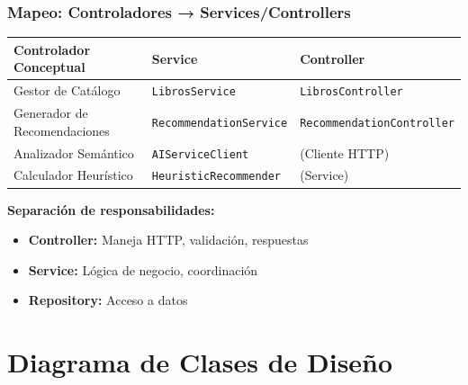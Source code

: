\documentclass[aspectratio=169]{beamer}
\begin{document}
\begin{frame}
\frametitle{Mapeo: Controladores → Services/Controllers}

\begin{table}
\centering
\tiny
\begin{tabular}{p{3.5cm}p{3.5cm}p{3.5cm}}
\toprule
\textbf{Controlador Conceptual} & \textbf{Service} & \textbf{Controller} \\
\midrule
Gestor de Catálogo & \texttt{LibrosService} & \texttt{LibrosController} \\
Generador de Recomendaciones & \texttt{RecommendationService} & \texttt{RecommendationController} \\
Analizador Semántico & \texttt{AIServiceClient} & (Cliente HTTP) \\
Calculador Heurístico & \texttt{HeuristicRecommender} & (Service) \\
\bottomrule
\end{tabular}
\end{table}

\vspace{0.3cm}

\textbf{Separación de responsabilidades:}
\begin{itemize}
\item \textbf{Controller:} Maneja HTTP, validación, respuestas
\item \textbf{Service:} Lógica de negocio, coordinación
\item \textbf{Repository:} Acceso a datos
\end{itemize}

\end{frame}

\section{Diagrama de Clases de Diseño}
\end{document}
